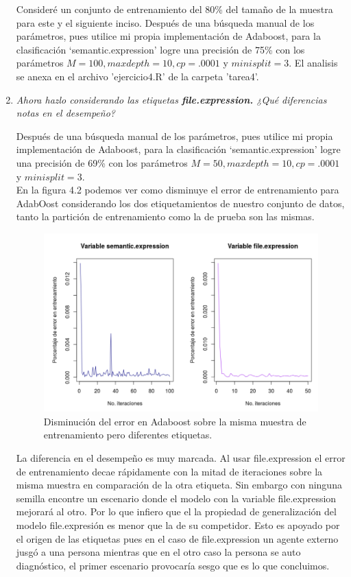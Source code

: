 \documentclass[paper=letter, fontsize=11pt]{scrartcl}
\numberwithin{equation}{section} %
\numberwithin{figure}{section} %
\numberwithin{table}{section} %
\begin{document}
\begin{enumerate}
Consideré un conjunto de entrenamiento del 80\% del tamaño de la muestra para este y el siguiente inciso. Después de una búsqueda manual de los parámetros, pues utilice mi propia implementación de Adaboost, para la clasificación ‘semantic.expression’  logre una precisión de 75\% con los parámetros $M = 100, maxdepth = 10, cp = .0001$ y $ minisplit = 3$. El analisis se anexa en el archivo 'ejercicio4.R' de la carpeta 'tarea4'.

\item \textit{Ahora hazlo considerando las etiquetas \textbf{file.expression.} ¿Qué diferencias notas en
el desempeño?}

Después de una búsqueda manual de los parámetros, pues utilice mi propia implementación de Adaboost, para la clasificación ‘semantic.expression’  logre una precisión de 69\% con los parámetros $M = 50, maxdepth = 10, cp = .0001$ y $ minisplit = 3$. \\
En la figura 4.2 podemos ver como disminuye el error de entrenamiento para AdabOost considerando los dos etiquetamientos de nuestro conjunto de datos, tanto la partición de entrenamiento como la de prueba son las mismas. \\

\begin{figure}[H]
  \begin{center}
    \includegraphics[scale =.5]{EJERCICIO4.jpg}
    \caption{Disminución del error en Adaboost sobre la misma muestra de entrenamiento pero diferentes etiquetas.}
    \label{figura4_2}
  \end{center}
\end{figure}
La diferencia en el desempeño es muy marcada. Al usar file.expression el error de entrenamiento decae rápidamente con la mitad de iteraciones sobre la misma muestra en comparación de la otra etiqueta. Sin embargo con ninguna semilla encontre un escenario donde el modelo con la variable file.expression mejorará al otro. Por lo que infiero que el la propiedad de generalización del modelo file.expresión es menor que la de su competidor. Esto es apoyado por el origen de las etiquetas pues en el caso de file.expression un agente externo jusgó a una persona mientras que en el otro caso la persona se auto diagnóstico, el primer escenario provocaría sesgo que es lo que concluimos.\\




\end{enumerate}
\end{document}
